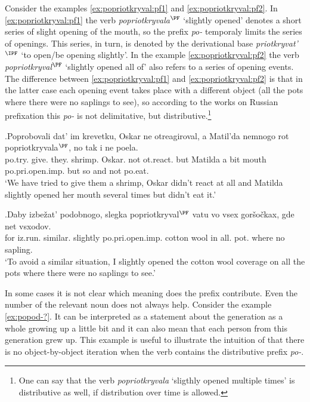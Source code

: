 Consider the examples \ref{ex:popriotkryval:pf1} and \ref{ex:popriotkryval:pf2}. In \ref{ex:popriotkryval:pf1} the verb \textit{popriotkryvala}$^{\PF}$ `slightly opened' denotes a short series of slight opening of the mouth, so the prefix \textit{po-} temporaly limits the series of openings. This series, in turn, is denoted by the derivational base \textit{priotkryvat'}$^{\IPF}$ `to open/be opening slightly'. In the example \ref{ex:popriotkryval:pf2} the verb  \textit{popriotkryval}$^{\PF}$ `slightly opened all of' also refers to a series of opening events. The difference between \ref{ex:popriotkryval:pf1} and \ref{ex:popriotkryval:pf2} is that in the latter case each opening event takes place with a different object (all the pots where there were no saplings to see), so according to the works on Russian prefixation this \textit{po-} is not delimitative, but distributive.\footnote{One can say that the verb \textit{popriotkryvala} `sligthly opened multiple times' is distributive as well, if distribution over time is allowed.}

\exg.\label{ex:popriotkryval:pf1}Poprobovali dat' im krevetku, Oskar ne otreagiroval, a Matil'da nemnogo rot popriotkryvala$^{\PF}$, no tak i ne poela.\\
po.try. give. they. shrimp. Oskar. not ot.react. but Matilda {a bit} mouth po.pri.open.imp. but so and not po.eat.\\
\trans `We have tried to give them a shrimp, Oskar didn't react at all and Matilda slightly opened her mouth several times but didn't eat it.'\\

\exg.\label{ex:popriotkryval:pf2}Daby izbe\v{z}at' podobnogo, slegka popriotkryval$^{\PF}$ vatu vo vsex gor\v{s}o\v{c}kax, gde net vsxodov.\\
for iz.run. similar. slightly po.pri.open.imp. {cotton wool} in all. pot. where no sapling.\\
\trans `To avoid a similar situation, I slightly opened the cotton wool coverage on all the pots where there were no saplings to see.'\\

In some cases it is not clear which meaning does the prefix contribute. Even the number of the relevant noun does not always help. Consider the example \ref{ex:popod-?}. It can be interpreted as a statement about the generation as a whole growing up a little bit and it can also mean that each person from this generation grew up. This example is useful to illustrate the intuition of \citet{Isachenko:60} that there is no object-by-object iteration when the verb contains the distributive prefix \textit{po-}.


